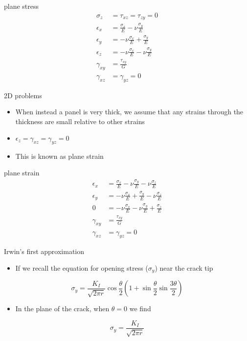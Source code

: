 \documentclass[
  letterpaper,
  ignorenonframetext,
  aspectratio=43,
  handout,
  12pt]{beamer}
\providecommand{\tightlist}{%
  \setlength{\itemsep}{0pt}\setlength{\parskip}{0pt}}
\providecommand{\tightlist}{%
\setlength{\itemsep}{0pt}\setlength{\parskip}{0pt}}
\begin{document}
\begin{frame}{plane stress}
\protect\hypertarget{plane-stress}{}
\[\begin{aligned}
  \sigma_z &= \tau_{xz} = \tau_{zy} = 0\\
  \epsilon_x &= \frac{\sigma_x}{E} - \nu \frac{\sigma_y}{E}\\
  \epsilon_y &= -\nu \frac{\sigma_x}{E} + \frac{\sigma_y}{E}\\
  \epsilon_z &= -\nu \frac{\sigma_x}{E} - \nu \frac{\sigma_y}{E}\\
  \gamma_{xy} &= \frac{\tau_{xy}}{G}\\
  \gamma_{xz} &= \gamma_{yz} = 0
\end{aligned}\]
\end{frame}

\begin{frame}{2D problems}
\protect\hypertarget{d-problems-1}{}
\begin{itemize}
\tightlist
\item
  When instead a panel is very thick, we assume that any strains through
  the thickness are small relative to other strains
\item
  \(\epsilon_z = \gamma_{xz} = \gamma_{yz} = 0\)
\item
  This is known as plane strain
\end{itemize}
\end{frame}

\begin{frame}{plane strain}
\protect\hypertarget{plane-strain}{}
\[\begin{aligned}
  \epsilon_x &= \frac{\sigma_x}{E} - \nu \frac{\sigma_y}{E} - \nu \frac{\sigma_z}{E}\\
  \epsilon_y &= -\nu \frac{\sigma_x}{E} + \frac{\sigma_y}{E} - \nu \frac{\sigma_z}{E}\\
  0 &= -\nu \frac{\sigma_x}{E} - \nu \frac{\sigma_y}{E} + \frac{\sigma_z}{E}\\
  \gamma_{xy} &= \frac{\tau_{xy}}{G}\\
  \gamma_{xz} &= \gamma_{yz} = 0
\end{aligned}\]
\end{frame}

\begin{frame}{Irwin's first approximation}
\protect\hypertarget{irwins-first-approximation}{}
\begin{itemize}
\tightlist
\item
  If we recall the equation for opening stress (\(\sigma_y\)) near the
  crack tip
\end{itemize}

\[\sigma_y = \frac{K_I}{\sqrt{2\pi r}} \cos \frac{\theta}{2} \left(1+\sin \frac{\theta}{2}\sin \frac{3\theta}{2}\right) \tag{1.2}\]

\begin{itemize}
\tightlist
\item
  In the plane of the crack, when \(\theta=0\) we find
\end{itemize}

\[\sigma_y = \frac{K_I}{\sqrt{2\pi r}}\]
\end{frame}
\end{document}

